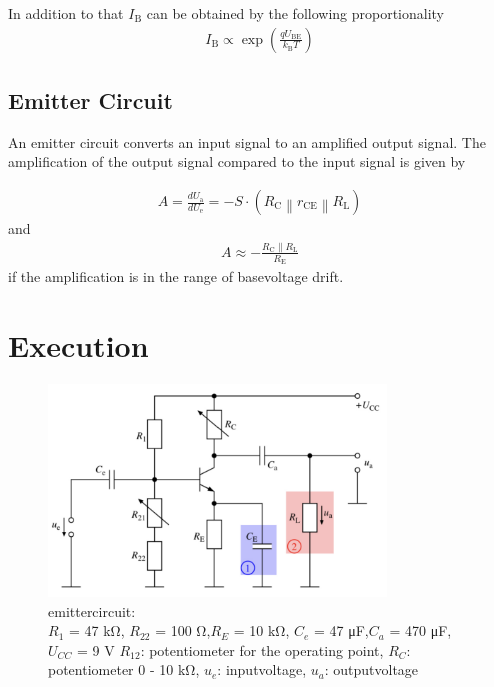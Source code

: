 \documentclass[11pt, a4paper]{article}
\begin{document}
In addition to that $I_{\mathrm{B}}$ can be obtained by the following proportionality 
\begin{align}
    I_{\mathrm{B}} \propto \exp \left(\frac{q U_{\mathrm{BE}}}{k_{\mathrm{B}} T}\right)
    \label{eq:Ib_T}
\end{align}

\FloatBarrier
\subsection{Emitter Circuit}
An emitter circuit converts an input signal to an amplified output signal. The amplification of the output signal compared to the input signal is given by


\begin{align}
    A=\frac{d U_{\mathrm{a}}}{d U_{\mathrm{e}}}=-S \cdot\left(R_{\mathrm{C}}\left\|r_{\mathrm{CE}}\right\| R_{\mathrm{L}}\right)
    \label{eq:ampEasy}
\end{align}
and 
\begin{align}
A \approx-\frac{R_{\mathrm{C}} \| R_{\mathrm{L}}}{R_{\mathrm{E}}}
\label{eq:ampDrift}
\end{align}
if the amplification is in the range of basevoltage drift.
\section{Execution}
\begin{figure}[h]
    \centering
    \includegraphics[width=0.8\textwidth]{bilder/Emitter circuit.png}
    \caption{emittercircuit:\\
    $R_1$ = 47 \si{\kilo\ohm}, $R_{22}$ = 100 \si{\ohm},$R_E$ = 10 \si{\kilo\ohm}, $C_e$ = 47 \si{\micro\farad},$C_a$ = 470 \si{\micro\farad}, $U_{CC}$ = 9 \si{\volt} 
    $R_{12}$: potentiometer for the operating point, $R_C$: potentiometer 0 - 10 \si{\kilo\ohm}, $u_e$: inputvoltage, $u_a$: outputvoltage
    }
    \label{im:Emcir}
\end{figure}
\end{document}
